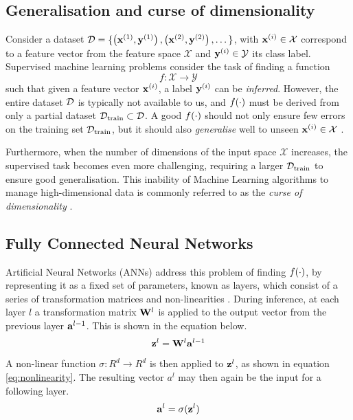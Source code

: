 \subsection{Generalisation and curse of dimensionality}
	Consider a dataset $\mathcal{D} = \{ \left( \mathbf{x}^{(1)}, \mathbf{y}^{(1)} \right), \left( \mathbf{x}^{(2)}, \mathbf{y}^{(2)} \right), \dots \}$, with $\mathbf{x}^{(i)} \in \mathcal{X}$ correspond to a feature vector from the feature space $\mathcal{X}$ and $\mathbf{y}^{(i)} \in \mathcal{Y}$ its class label. Supervised machine learning problems consider the task of finding a function
	$$f: \mathcal{X} \rightarrow \mathcal{Y} \label{eq:fxy} $$
	such that given a feature vector $\mathbf{x}^{(i)}$, a label $\mathbf{y}^{(i)}$ can be \textit{inferred}. However, the entire dataset $\mathcal{D}$ is typically not available to us, and $f(\cdot)$ must be derived from only a partial dataset $\mathcal{D}_{\text{train}} \subset \mathcal{D}$. A good $f(\cdot)$ should not only ensure few errors on the training set $\mathcal{D}_{\text{train}}$, but it should also \textit{generalise} well to unseen $\mathbf{x}^{(i)} \in \mathcal{X}$ \citep{neyshaburExploringGeneralizationDeep2017, chungUnknownExamplesMachine2019, barbieroModelingGeneralizationMachine2020}.

	Furthermore, when the number of dimensions of the input space $\mathcal{X}$ increases, the supervised task becomes even more challenging, requiring a larger $\mathcal{D}_{\text{train}}$ to ensure good generalisation. This inability of Machine Learning algorithms to manage high-dimensional data is commonly referred to as the \textit{curse of dimensionality} \citep{rustUsingRandomizationBreak1997, aremuMachineLearningApproach2020, stuartrussellArtificialIntelligenceModern2022}.
	
\subsection{Fully Connected Neural Networks}
		Artificial Neural Networks (ANNs) address this problem of finding $f(\cdot)$, by representing it as a fixed set of parameters, known as layers, which consist of a series of transformation matrices and non-linearities \citep{jainArtificialNeuralNetworks1996, kroghWhatAreArtificial2008, zhangArtificialNeuralNetwork2018}. During inference, at each layer $l$ a transformation matrix $\mathbf{W}^l$ is applied to the output vector from the previous layer $\mathbf{a}^{l-1}$. This is shown in the equation below.
		$$ \mathbf{z}^l = \mathbf{W}^l \mathbf{a}^{l-1} $$
		A non-linear function $\sigma: R^d \rightarrow R^d$ is then applied to $\mathbf{z}^{l}$, as shown in equation \ref{eq:nonlinearity}. The resulting vector $a^l$ may then again be the input for a following layer.
		$$
			\mathbf{a}^l = \sigma(\mathbf{z}^{l})	\label{eq:nonlinearity}
		$$
		
